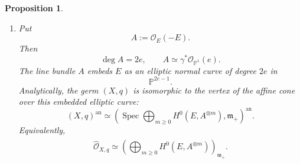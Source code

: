 \documentclass[11pt,twoside]{amsart}
\theoremstyle{plain}
\numberwithin{equation}{section}
\newtheorem{proposition}[theorem]{Proposition}
\theoremstyle{definition}
\begin{document}
\begin{proposition}
\begin{enumerate}
    \item Put
    \[
    A:=\mathcal O_E(-E).
    \]
    Then
    \[
    \deg A=2e,
    \qquad
    A\simeq\gamma^*\mathcal O_{\mathbb P^1}(e).
    \]
    The line bundle $A$ embeds $E$ as an elliptic normal curve of degree $2e$ in
    \[
    \mathbb P^{2e-1}.
    \]
    Analytically, the germ $(X,q)$ is isomorphic to the vertex of the affine cone over this embedded elliptic curve:
    \[
    (X,q)^{\mathrm{an}}
    \simeq
    \left(
    \operatorname{Spec}
    \bigoplus_{m\geq0}H^0\!\left(E,A^{\otimes m}\right),
    \mathfrak m_+
    \right)^{\mathrm{an}}.
    \]
    Equivalently,
    \[
    \widehat{\mathcal O}_{X,q}
    \simeq
    \widehat{
    \left(
    \bigoplus_{m\geq0}H^0\!\left(E,A^{\otimes m}\right)
    \right)_{\mathfrak m_+}
    }.
    \]
\end{enumerate}
\end{proposition}
\end{document}
